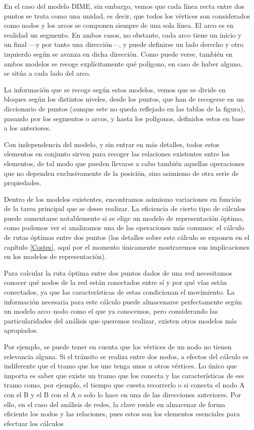 \begin{multicols}{2}
En el caso del modelo DIME, sin embargo, vemos que cada línea recta entre dos puntos se trata como una unidad, es decir, que todos los vértices son considerados como nodos y los arcos se componen siempre de una sola línea. El arco es en realidad un segmento. En ambos casos, no obstante, cada arco tiene un inicio y un final ---y por tanto una dirección---, y puede definirse un lado derecho y otro izquierdo según se avanza en dicha dirección. Como puede verse, también en ambos modelos se recoge explícitamente qué polígono, en caso de haber alguno, se sitúa a cada lado del arco.

La información que se recoge según estos modelos, vemos que se divide en bloques según los distintos niveles, desde los puntos, que han de recogerse en un diccionario de puntos (aunque este no queda reflejado en las tablas de la figura), pasando por los segmentos o arcos, y hasta los polígonos, definidos estos en base a los anteriores.

Con independencia del modelo, y sin entrar en más detalles, todos estos elementos en conjunto sirven para recoger las relaciones existentes entre los elementos, de tal modo que pueden llevarse a cabo también aquellas operaciones que no dependen exclusivamente de la posición, sino asimismo de otra serie de propiedades.

Dentro de los modelos existentes, encontramos asimismo variaciones en función de la tarea principal que se desee realizar. La eficiencia de cierto tipo de cálculos puede aumentarse notablemente si se elige un modelo de representación óptimo, como podemos ver si analizamos una de las operaciones más comunes: el cálculo de rutas óptimas entre dos puntos (los detalles sobre este cálculo se exponen en el capítulo \ref{Costes}, aquí por el momento únicamente mostraremos sus implicaciones en los modelos de representación).

Para calcular la ruta óptima entre dos puntos dados de una red necesitamos conocer qué nodos de la red están conectados entre sí y por qué vías están conectados, ya que las características de estas condicionan el movimiento. La información necesaria para este cálculo puede almacenarse perfectamente según un modelo arco--nodo como el que ya conocemos, pero considerando las particularidades del análisis que queremos realizar, existen otros modelos más apropiados. 

Por ejemplo, se puede tener en cuenta que los vértices de un nodo no tienen relevancia alguna. Si el tránsito se realiza entre dos nodos, a efectos del cálculo es indiferente que el tramo que los une tenga unos u otros vértices. Lo único que importa es saber que existe un tramo que los conecta y las características de ese tramo como, por ejemplo, el tiempo que cuesta recorrerlo o si conecta el nodo A con el B y el B con el A o solo lo hace en una de las direcciones anteriores. Por ello, en el caso del análisis de redes, la clave reside en almacenar de forma eficiente los nodos y las relaciones, pues estos son los elementos esenciales para efectuar los cálculos


\end{multicols}
